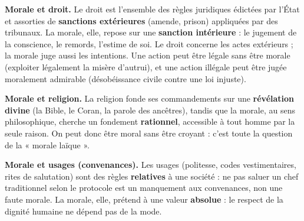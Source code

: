 \documentclass[11pt]{article}
\newcommand{\cle}[1]{{\popxbold\color{popdark}#1}}
\begin{document}
\textbf{Morale et droit.} Le \cle{droit} est l'ensemble des règles juridiques édictées par l'État et assorties de \textbf{sanctions extérieures} (amende, prison) appliquées par des tribunaux. La morale, elle, repose sur une \textbf{sanction intérieure} : le jugement de la conscience, le remords, l'estime de soi. Le droit concerne les actes extérieurs ; la morale juge aussi les intentions. Une action peut être légale sans être morale (exploiter légalement la misère d'autrui), et une action illégale peut être jugée moralement admirable (désobéissance civile contre une loi injuste).

\textbf{Morale et religion.} La religion fonde ses commandements sur une \textbf{révélation divine} (la Bible, le Coran, la parole des ancêtres), tandis que la morale, au sens philosophique, cherche un fondement \textbf{rationnel}, accessible à tout homme par la seule raison. On peut donc être moral sans être croyant : c'est toute la question de la « morale laïque ».

\textbf{Morale et usages (convenances).} Les usages (politesse, codes vestimentaires, rites de salutation) sont des règles \textbf{relatives} à une société : ne pas saluer un chef traditionnel selon le protocole est un manquement aux convenances, non une faute morale. La morale, elle, prétend à une valeur \textbf{absolue} : le respect de la dignité humaine ne dépend pas de la mode.
\end{document}
